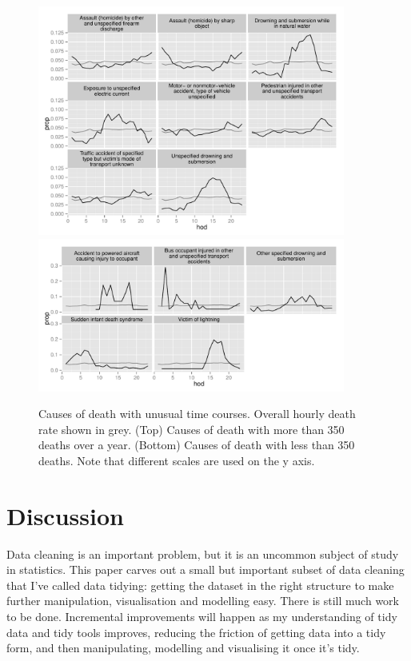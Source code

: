 \documentclass[article]{jss}
\begin{document}
\begin{figure}[htbp]
  \centering
    \includegraphics[width=0.9\textwidth]{case-study/unusual-big}
    \includegraphics[width=0.9\textwidth]{case-study/unusual-sml}
  \caption{Causes of death with unusual time courses. Overall hourly death rate shown in grey. (Top) Causes of death with more than 350 deaths over a year. (Bottom) Causes of death with less than 350 deaths.  Note that different scales are used on the y axis.}
  \label{fig:disease}
\end{figure}

\section{Discussion}
\label{sec:discussion}

Data cleaning is an important problem, but it is an uncommon subject of study in statistics. This paper carves out a small but important subset of data cleaning that I've called data tidying: getting the dataset in the right structure to make further manipulation, visualisation and modelling easy. There is still much work to be done. Incremental improvements will happen as my understanding of tidy data and tidy tools improves, reducing the friction of getting data into a tidy form, and then manipulating, modelling and visualising it once it's tidy.
\end{document}
